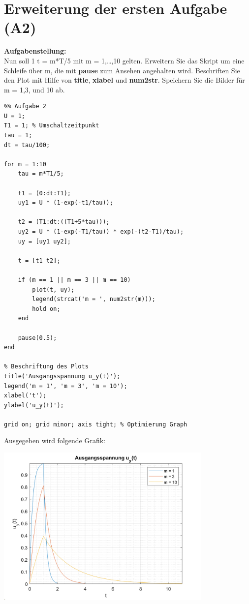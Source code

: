 \vspace{0.7cm}

\section{Erweiterung der ersten Aufgabe (A2)}

\textbf{Aufgabenstellung:\\}
Nun soll 1 t = m*T/5 mit m = 1,…,10 gelten. Erweitern Sie das Skript um eine Schleife über m, die mit \textbf{pause} zum Ansehen angehalten wird. Beschriften Sie den Plot mit Hilfe von \textbf{title}, \textbf{xlabel} und \textbf{num2str}. Speichern Sie die Bilder für m = 1,3, und 10 ab.

\vspace{1.5cm}

\begin{lstlisting}
%% Aufgabe 2
U = 1; 
T1 = 1; % Umschaltzeitpunkt
tau = 1; 
dt = tau/100;

for m = 1:10
	tau = m*T1/5;
	
	t1 = (0:dt:T1);
	uy1 = U * (1-exp(-t1/tau));
	
	t2 = (T1:dt:((T1+5*tau)));
	uy2 = U * (1-exp(-T1/tau)) * exp(-(t2-T1)/tau);
	uy = [uy1 uy2];
	
	t = [t1 t2];
	
	if (m == 1 || m == 3 || m == 10)
		plot(t, uy);
		legend(strcat('m = ', num2str(m)));
		hold on;
	end
	
	pause(0.5);	
end
	
% Beschriftung des Plots
title('Ausgangsspannung u_y(t)');
legend('m = 1', 'm = 3', 'm = 10');
xlabel('t');
ylabel('u_y(t)');

grid on; grid minor; axis tight; % Optimierung Graph
\end{lstlisting}

\vspace{1cm}

Ausgegeben wird folgende Grafik:

\begin{center}
	\includegraphics[width=300pt]{img/aufgabe2.png}
\end{center}

